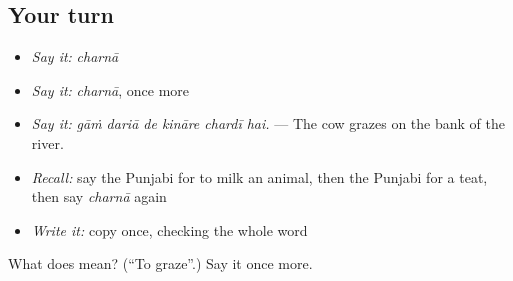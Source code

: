 \subsection*{Your turn}
\begin{itemize}
\raggedright
  \item \emph{Say it:} \emph{charnā}
  \item \emph{Say it:} \emph{charnā}, once more
  \item \emph{Say it:} \emph{gāṁ dariā de kināre chardī hai.} — The cow grazes on the bank of the river.
  \item \emph{Recall:} say the Punjabi for to milk an animal, then the Punjabi for a teat, then say \emph{charnā} again
  \item \emph{Write it:} copy \textbf{} once, checking the whole word
\end{itemize}

\begin{tcolorbox}[breakable,colback=teal!4,colframe=teal!35!black,title={Before you move on}]
What does  mean? (\textquotedblleft{}To graze\textquotedblright{}.) Say it once more.
\end{tcolorbox}
